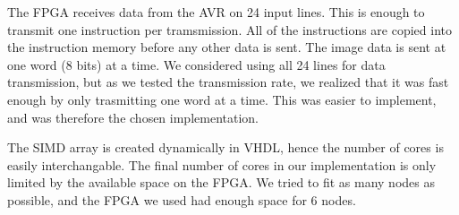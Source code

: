 The \ac{FPGA} receives data from the AVR on 24 input lines. This is enough to
transmit one instruction per tramsmission. All of the instructions are copied
into the instruction memory before any other data is sent. The image data is
sent at one word (8 bits) at a time. We considered using all 24 lines for data
transmission, but as we tested the transmission rate, we realized that it was
fast enough by only trasmitting one word at a time. This was easier to
implement, and was therefore the chosen implementation.

The \ac{SIMD} array is created dynamically in \ac{VHDL}, hence the number of
cores is easily interchangable. The final number of cores in our implementation
is only limited by the available space on the \ac{FPGA}. We tried to fit as many
nodes as possible, and the \ac{FPGA} we used had enough space for 6 nodes.
